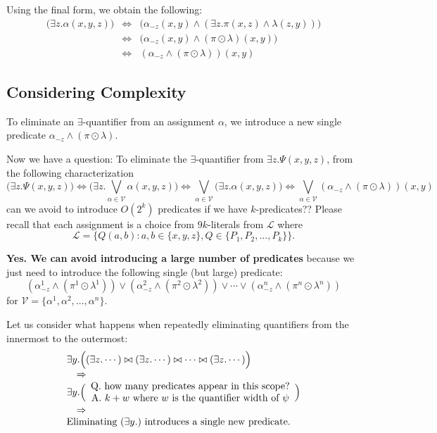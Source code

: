 \documentclass[a4paper,UKenglish,cleveref, autoref, thm-restate]{lipics-v2021}
\newcommand{\set}[1]{\{ #1 \}}
\begin{document}
Using the final form, we obtain the following:
$$
\begin{array}{lcl}
\biggl(\exists z. \alpha(x, y, z)\biggr) & \iff &
\biggl(\alpha_{-z}(x, y) \land (\exists z. \pi(x, z) \land \lambda(z, y))\biggr) \\
& \iff & \biggl(\alpha_{-z}(x, y) \land (\pi \odot \lambda)(x, y)\biggr) \\
& \iff & (\alpha_{-z} \land (\pi \odot \lambda))(x, y)
\end{array}
$$

\subsection{Considering Complexity}
To eliminate an $\exists$-quantifier from an assignment $\alpha$, we introduce a new single predicate $\alpha_{-z} \land (\pi \odot \lambda)$.

Now we have a question:
To eliminate the $\exists$-quantifier from $\exists z. \Psi(x, y, z)$,
from the following characterization
$$
\biggl(\exists z. \Psi(x,y, z)\biggr)
\iff \biggl(\exists z. \bigvee_{\alpha \in \mathcal{V}} \alpha(x, y, z)\biggr)
\iff \bigvee_{\alpha \in \mathcal{V}} \biggl(\exists z. \alpha(x, y, z)\biggr)
\iff \bigvee_{\alpha \in \mathcal{V}} (\alpha_{-z} \land (\pi \odot \lambda))(x, y)
$$
can we avoid to introduce $O(2^k)$ predicates if we have $k$-predicates??
Please recall that each assignment is a choice from $9k$-literals from $\mathcal{L}$ where
$$
\mathcal{L} = \set{ Q(a, b) : a, b \in \set{x, y, z}, Q \in \set{P_1, P_2, \ldots, P_k} }.
$$

\textbf{Yes. We can avoid introducing a large number of predicates} because
we just need to introduce the following single (but large) predicate:
$$
(\alpha^1_{-z} \land (\pi^1 \odot \lambda^1)) \lor (\alpha^2_{-z} \land (\pi^2 \odot \lambda^2)) \lor \cdots \lor (\alpha^n_{-z} \land (\pi^n \odot \lambda^n))
$$
for $\mathcal{V} = \set{ \alpha^1, \alpha^2, \ldots, \alpha^n }$.

Let us consider what happens when repeatedly eliminating quantifiers from the innermost to the outermost:
$$
\begin{array}{l}
\exists y.
\Bigl(
(\exists z. \cdots) \bowtie (\exists z. \cdots) \bowtie \cdots \bowtie (\exists z. \cdots)
\Bigr) \\
\quad \Rightarrow \\
\exists y. \Bigl(
\begin{array}{c}
\text{Q. how many predicates appear in this scope?} \\
\text{A. $k + w$ where $w$ is the quantifier width of $\psi$}
\end{array}
\Bigr) \\
\quad \Rightarrow \\
\text{Eliminating $(\exists y.)$ introduces a single new predicate.}
\end{array}
$$
\end{document}
